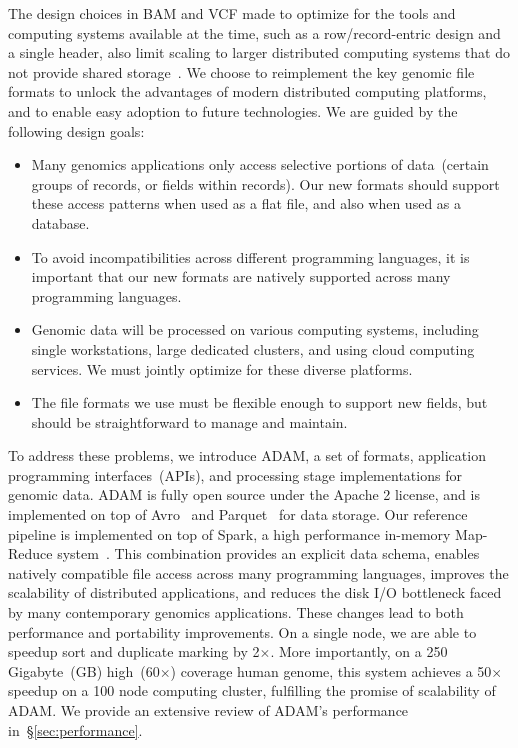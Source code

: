 \documentclass{bioinfo}
\begin{document}
The design choices in BAM and VCF made to optimize for the tools and computing systems available at the time, such as a row/record-entric design and a single header, also limit scaling to larger distributed computing systems that do not provide shared storage~\citet{niemenmaa12}. We choose to reimplement the key genomic file formats to unlock the advantages of modern distributed computing platforms, and to enable easy adoption
to future technologies. We are guided by the following design goals:

\begin{itemize}
\item Many genomics applications only access selective portions of data~(certain groups of records, or fields within records). Our new formats should support these access
patterns when used as a flat file, and also when used as a database.
\item  To avoid incompatibilities across different programming languages, it is important that our new formats are natively
supported across many programming languages.
\item Genomic data will be processed on various computing systems, including single workstations, large dedicated clusters,
and using cloud computing services. We must jointly optimize for these diverse platforms.
\item The file formats we use must be flexible enough to support new fields, but should be straightforward to manage and maintain.
\end{itemize}

To address these problems, we introduce ADAM, a set of formats, application programming interfaces~(APIs), and processing stage implementations for genomic data.
ADAM is fully open source under the Apache 2 license, and is implemented on top of Avro~\citep{avro} and Parquet~\citep{parquet} for data storage. Our reference pipeline
is implemented on top of Spark, a high performance in-memory Map-Reduce system~\citep{zaharia10}. This combination provides an explicit data schema, enables
natively compatible file access across many programming languages, improves the scalability of distributed applications, and reduces the disk I/O bottleneck faced by many
contemporary genomics applications. These changes lead to both performance and portability improvements. On a single
node, we are able to speedup sort and duplicate marking by 2$\times$. More importantly, on a 250 Gigabyte~(GB) high~(60$\times$) coverage
human genome, this system achieves a 50$\times$ speedup on a 100 node computing cluster, fulfilling the promise of scalability of ADAM.
We provide an extensive review of ADAM's performance in~\S\ref{sec:performance}.
\end{document}
